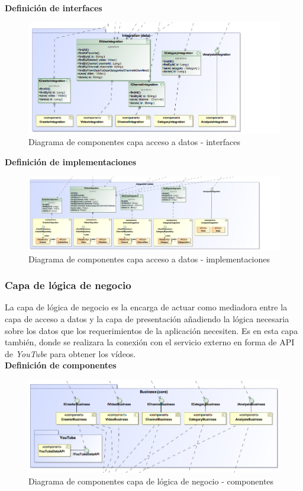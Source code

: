 \documentclass[11pt,a4paper]{article}
\begin{document}
\noindent\textbf{Definición de interfaces}
\begin{figure}[H]
\centering
\includegraphics[scale=0.3]{diseno/accesoDatos/ComponentDiagram2.png}
\caption{Diagrama de componentes capa acceso a datos - interfaces}
\end{figure}

\noindent\textbf{Definición de implementaciones}
\begin{figure}[H]
\centering
\includegraphics[scale=0.25]{diseno/accesoDatos/ComponentDiagram3.png}
\caption{Diagrama de componentes capa acceso a datos - implementaciones}
\end{figure}

\medskip 

\subsubsection{Capa de lógica de negocio}
La capa de lógica de negocio es la encarga de actuar como mediadora entre la capa de acceso a datos y la capa de presentación añadiendo la lógica necesaria sobre los datos que los requerimientos de la aplicación necesiten. Es en esta capa también, donde se realizara la conexión con el servicio externo en forma de API  de \textit{YouTube} para obtener los vídeos.
\\

\noindent\textbf{Definición de componentes}
\begin{figure}[H]
\centering
\includegraphics[scale=0.35]{diseno/negocio/ComponentsDiagram.png}
\caption{Diagrama de componentes capa de lógica de negocio - componentes}
\end{figure}
\end{document}
